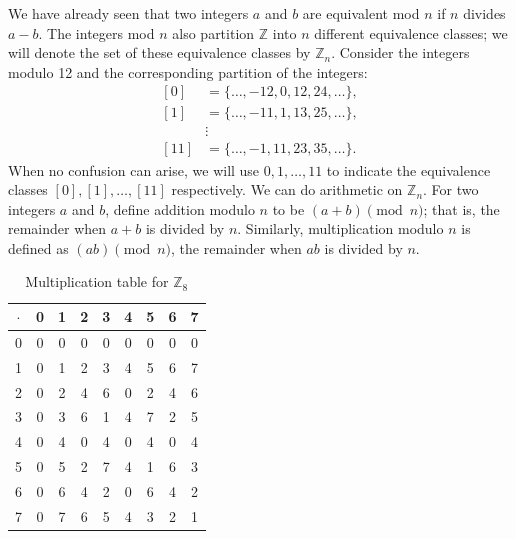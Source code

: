 We have already seen that two integers $a$ and $b$ are equivalent mod $n$ if $n$ divides $a - b$.  The integers mod $n$ also partition ${\mathbb Z}$ into $n$ different equivalence classes; we will denote the set of these equivalence classes by ${\mathbb Z}_n$.\label{integersmodn}  Consider the integers modulo 12 and the corresponding partition of the integers:  
\begin{align*}
{[0]} & = \{ \ldots, -12, 0, 12, 24, \ldots \}, \\
{[1]} & = \{ \ldots, -11, 1, 13, 25, \ldots \}, \\
      & \vdots  \\
{[11]} & = \{ \ldots, -1, 11, 23, 35, \ldots \}.
\end{align*}
When no confusion can arise, we will use $0, 1, \ldots, 11$ to indicate the equivalence classes  ${[0]}, {[1]}, \ldots, {[11]}$ respectively.  We can do arithmetic on ${\mathbb Z}_n$.  For two integers $a$ and $b$, define addition modulo $n$ to be $(a + b) \pmod{n}$; that is, the remainder when $a + b$ is divided by $n$.  Similarly, multiplication modulo $n$ is defined as $(a  b) \pmod{ n}$, the remainder when $a  b$ is divided by $n$.



\begin{table}[htb]\label{groups_Z8_mult_table}
\caption{Multiplication table for ${\mathbb Z}_8$}{\small
\begin{center}
\begin{tabular}{c|cccccccc}
$\cdot$ & 0 & 1 & 2 & 3 & 4 & 5 & 6 & 7 \\
\hline
0       & 0 & 0 & 0 & 0 & 0 & 0 & 0 & 0 \\
1       & 0 & 1 & 2 & 3 & 4 & 5 & 6 & 7 \\
2       & 0 & 2 & 4 & 6 & 0 & 2 & 4 & 6 \\
3       & 0 & 3 & 6 & 1 & 4 & 7 & 2 & 5 \\
4       & 0 & 4 & 0 & 4 & 0 & 4 & 0 & 4 \\
5       & 0 & 5 & 2 & 7 & 4 & 1 & 6 & 3 \\
6       & 0 & 6 & 4 & 2 & 0 & 6 & 4 & 2 \\
7       & 0 & 7 & 6 & 5 & 4 & 3 & 2 & 1
\end{tabular}
\end{center}
}
\end{table}
 


